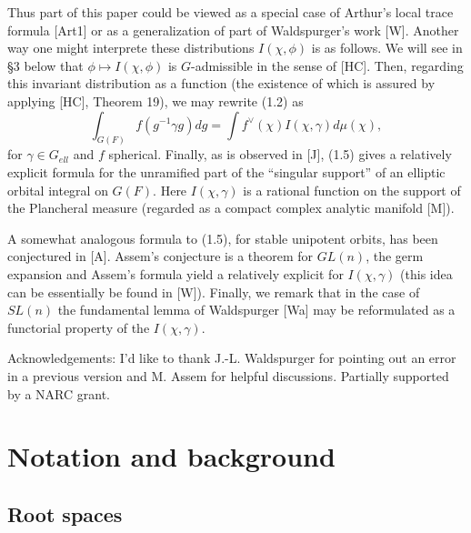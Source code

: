 \documentclass[12pt]{article}
\begin{document}
Thus part of this paper could be viewed as a special case of Arthur's local trace formula [Art1] or as a generalization of part of Waldspurger's work [W]. Another way one might interprete these distributions $I(\chi,\phi)$ is as follows. We will see in \S3 below that $\phi\longmapsto I(\chi,\phi)$ is $G$-admissible in the sense of [HC]. Then, regarding this invariant distribution as a function (the existence of which is assured by applying [HC], Theorem 19), we may rewrite (1.2) as
\begin{equation}\tag{1.5}
\int_{G(F)}f(g^{-1}\gamma g)dg=\int f^\vee(\chi)I(\chi,\gamma)d\mu(\chi),
\end{equation}
for $\gamma\in G_{ell}$ and $f$ spherical. Finally, as is observed in [J], (1.5) gives a relatively explicit formula for the unramified part of the ``singular support'' of an elliptic orbital integral on $G(F)$. Here $I(\chi,\gamma)$ is a rational function on the support of the Plancheral measure (regarded as a compact complex analytic manifold [M]).

A somewhat analogous formula to (1.5), for stable unipotent orbits, has been conjectured in [A]. Assem's conjecture is a theorem for $GL(n)$, the germ expansion and Assem's formula yield a relatively explicit for $I(\chi,\gamma)$ (this idea can be essentially be found in [W]). Finally, we remark that in the case of $SL(n)$ the fundamental lemma of Waldspurger [Wa] may be reformulated as a functorial property of the $I(\chi,\gamma)$.

Acknowledgements: I'd like to thank J.-L. Waldspurger for pointing out an error in a previous version and M. Assem for helpful discussions. Partially supported by a NARC grant.

\section{Notation and background}

\subsection{Root spaces}
\end{document}
